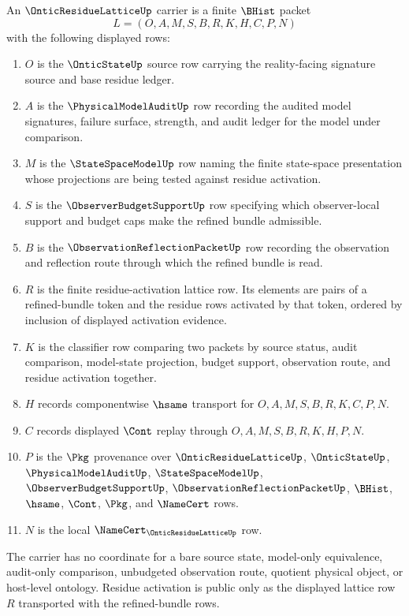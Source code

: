 \begin{definition}
\label{def:ontic-residue-lattice-carrier}
An $\OnticResidueLatticeUp$ carrier is a finite $\BHist$ packet
$$
L=(O,A,M,S,B,R,K,H,C,P,N)
$$
with the following displayed rows:
\begin{enumerate}
\item $O$ is the $\OnticStateUp$ source row carrying the reality-facing signature source and base residue ledger.
\item $A$ is the $\PhysicalModelAuditUp$ row recording the audited model signatures, failure surface, strength, and audit ledger for the model under comparison.
\item $M$ is the $\StateSpaceModelUp$ row naming the finite state-space presentation whose projections are being tested against residue activation.
\item $S$ is the $\ObserverBudgetSupportUp$ row specifying which observer-local support and budget caps make the refined bundle admissible.
\item $B$ is the $\ObservationReflectionPacketUp$ row recording the observation and reflection route through which the refined bundle is read.
\item $R$ is the finite residue-activation lattice row. Its elements are pairs of a refined-bundle token and the residue rows activated by that token, ordered by inclusion of displayed activation evidence.
\item $K$ is the classifier row comparing two packets by source status, audit comparison, model-state projection, budget support, observation route, and residue activation together.
\item $H$ records componentwise $\hsame$ transport for $O,A,M,S,B,R,K,C,P,N$.
\item $C$ records displayed $\Cont$ replay through $O,A,M,S,B,R,K,H,P,N$.
\item $P$ is the $\Pkg$ provenance over $\OnticResidueLatticeUp$, $\OnticStateUp$, $\PhysicalModelAuditUp$, $\StateSpaceModelUp$, $\ObserverBudgetSupportUp$, $\ObservationReflectionPacketUp$, $\BHist$, $\hsame$, $\Cont$, $\Pkg$, and $\NameCert$ rows.
\item $N$ is the local $\NameCert_{\OnticResidueLatticeUp}$ row.
\end{enumerate}
The carrier has no coordinate for a bare source state, model-only equivalence, audit-only comparison, unbudgeted observation route, quotient physical object, or host-level ontology. Residue activation is public only as the displayed lattice row $R$ transported with the refined-bundle rows.
\end{definition}

